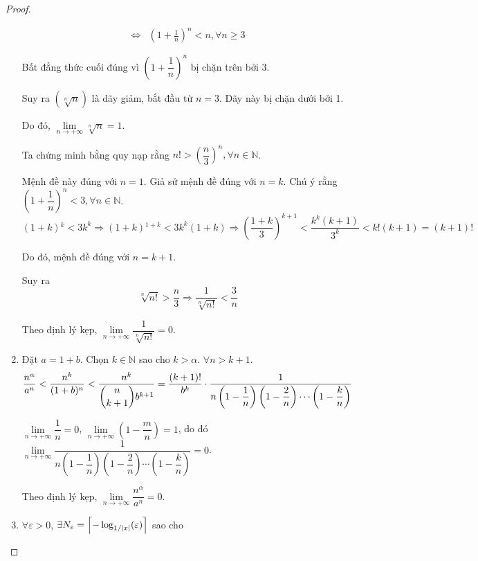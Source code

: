 \documentclass[class=analysis,crop=false]{standalone}
\begin{document}
\begin{proof}
\begin{enumerate}[label = (\roman*)]
\begin{align*}
                  \Leftrightarrow & \left(1 + \frac{1}{n}\right)^{n} < n, \forall n\ge 3
              \end{align*}
              \par Bất đẳng thức cuối đúng vì $\left(1+\dfrac{1}{n}\right)^{n}$ bị chặn trên bởi 3.
              \par Suy ra $(\sqrt[n]{n})$ là dãy giảm, bắt đầu từ $n = 3$. Dãy này bị chặn dưới bởi 1.
              \par Do đó, $\lim\limits_{n\to+\infty}\sqrt[n]{n} = 1$.
              \bigskip
              \par Ta chứng minh bằng quy nạp rằng $n! > \left(\dfrac{n}{3}\right)^{n}, \forall n\in\mathbb{N}$.
              \par Mệnh đề này đúng với $n = 1$. Giả sử mệnh đề đúng với $n = k$. Chú ý rằng $\left(1 + \dfrac{1}{n}\right)^{n} < 3, \forall n\in\mathbb{N}$.
              \[
                  (1 + k){}^{k} < 3k^{k}\Rightarrow (1 + k){}^{1 + k} < 3k^{k}(1 + k) \Rightarrow \left(\dfrac{1 + k}{3}\right)^{k+1} < \dfrac{k^{k}(k+1)}{3^{k}} < k!(k+1) = (k+1)!
              \]
              \par Do đó, mệnh đề đúng với $n = k + 1$.
              \bigskip
              \par Suy ra
              \[
                  \sqrt[n]{n!} > \dfrac{n}{3} \Longrightarrow \dfrac{1}{\sqrt[n]{n!}} < \dfrac{3}{n}
              \]
              \par Theo định lý kẹp, $\lim\limits_{n\to+\infty}\dfrac{1}{\sqrt[n]{n!}} = 0$.
        \item Đặt $a = 1 + b$. Chọn $k\in\mathbb{N}$ sao cho $k > \alpha$. $\forall n > k + 1$.
              \[
                  \dfrac{n^{\alpha}}{a^{n}} < \dfrac{n^{k}}{(1 + b){}^{n}} < \dfrac{n^{k}}{\dbinom{n}{k+1}b^{k+1}} = \dfrac{(k+1)!}{b^{k}}\cdot\dfrac{1}{n\left(1 - \dfrac{1}{n}\right)\left(1 - \dfrac{2}{n}\right)\cdots\left(1 - \dfrac{k}{n}\right)}
              \]
              \par $\lim\limits_{n\to+\infty}\dfrac{1}{n} = 0$, $\lim\limits_{n\to+\infty}\left(1 - \dfrac{m}{n}\right) = 1$, do đó $\lim\limits_{n\to+\infty}\dfrac{1}{n\left(1 - \dfrac{1}{n}\right)\left(1 - \dfrac{2}{n}\right)\cdots\left(1 - \dfrac{k}{n}\right)} = 0$.
              \par Theo định lý kẹp, $\lim\limits_{n\to+\infty}\dfrac{n^{\alpha}}{a^{n}} = 0$.
        \item $\forall\varepsilon > 0$, $\exists N_{\varepsilon} = \left\lceil{-\log_{1/\left\vert{x}\right\vert}(\varepsilon)}\right\rceil$ sao cho

\end{enumerate}
\end{proof}
\end{document}
